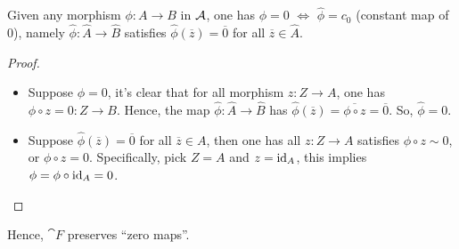 \documentclass{article}
\begin{document}
\begin{lem}
    Given any morphism $\phi:A\rightarrow B$ in $\cal{A}$, one has $\phi=0$ $\iff$ $\hat{\phi}=c_0$ (constant map of $0$), namely $\hat{\phi}:\hat{A}\rightarrow\hat{B}$ satisfies $\hat{\phi}(\overline{z})=\overline{0}$ for all $\overline{z}\in\hat{A}$.
\end{lem}
\begin{proof}

    \hfil

    \begin{itemize}
        \item[$\implies$:] Suppose $\phi=0$, it's clear that for all morphism $z:Z\rightarrow A$, one has $\phi\circ z=0:Z\rightarrow B$. Hence, the map $\hat{\phi}:\hat{A}\rightarrow \hat{B}$ has $\hat{\phi}(\overline{z})=\overline{\phi\circ z}=\overline{0}$. So, $\hat{\phi}=0$.
        \item[$\impliedby$:] Suppose $\hat{\phi}(\overline{z})=\overline{0}$ for all $\overline{z}\in A$, then one has all $z:Z\rightarrow A$ satisfies $\phi\circ z\sim 0$, or $\phi\circ z=0$. Specifically, pick $Z=A$ and $z=\mathrm{id}_A$, this implies $\phi=\phi\circ \mathrm{id}_A = 0$. 
    \end{itemize}
\end{proof}

Hence, $\cat{F}$ preserves ``zero maps''.

\hfil
\end{document}
